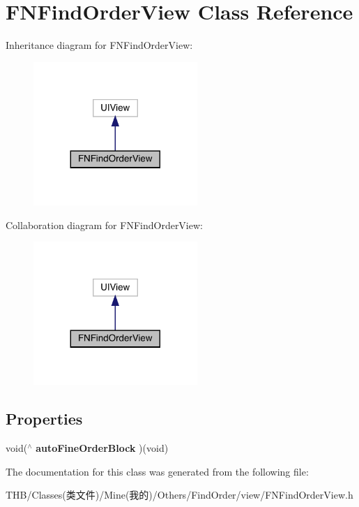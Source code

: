 \hypertarget{interface_f_n_find_order_view}{}\section{F\+N\+Find\+Order\+View Class Reference}
\label{interface_f_n_find_order_view}


Inheritance diagram for F\+N\+Find\+Order\+View\+:\nopagebreak
\begin{figure}[H]
\begin{center}
\leavevmode
\includegraphics[width=176pt]{interface_f_n_find_order_view__inherit__graph}
\end{center}
\end{figure}


Collaboration diagram for F\+N\+Find\+Order\+View\+:\nopagebreak
\begin{figure}[H]
\begin{center}
\leavevmode
\includegraphics[width=176pt]{interface_f_n_find_order_view__coll__graph}
\end{center}
\end{figure}
\subsection*{Properties}
\begin{DoxyCompactItemize}
\item 
\mbox{\label{interface_f_n_find_order_view_a6717b52849798ffe34a0bbf3d44901e4}} 
void($^\wedge$ {\bfseries auto\+Fine\+Order\+Block} )(void)
\end{DoxyCompactItemize}


The documentation for this class was generated from the following file\+:\begin{DoxyCompactItemize}
\item 
T\+H\+B/\+Classes(类文件)/\+Mine(我的)/\+Others/\+Find\+Order/view/F\+N\+Find\+Order\+View.\+h\end{DoxyCompactItemize}
